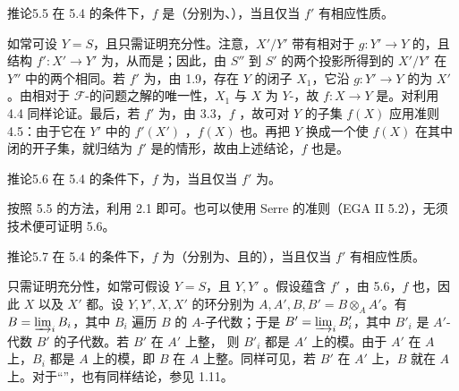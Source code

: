 \begin{SGAresult}{推论}{5.5}
在 5.4 的条件下，$f$ 是（分别为、），当且仅当 $f'$ 有相应性质。
\end{SGAresult}
如常可设 $Y=S$，且只需证明充分性。注意，$X'/Y'$ 带有相对于 $g:Y'\to Y$ 的，且结构 $f':X'\to Y'$ 为，从而是；因此，由 $S''$ 到 $S'$ 的两个投影所得到的 $X'/Y'$ 在 $Y''$ 中的两个相同。若 $f'$ 为，由 1.9，存在 $Y$ 的闭子 $X_1$，它沿 $g:Y'\to Y$ 的为 $X'$。由相对于 $\mathcal F$-的问题之解的唯一性，$X_1$ 与 $X$ 为 $Y$-，故 $f:X\to Y$ 是。对利用 4.4 同样论证。最后，若 $f'$ 为，由 3.3，$f$ ，故可对 $Y$ 的子集 $f(X)$ 应用准则 4.5：由于它在 $Y'$ 中的 $f'(X')$ ，$f(X)$ 也。再把 $Y$ 换成一个使 $f(X)$ 在其中闭的开子集，就归结为 $f'$ 是的情形，故由上述结论，$f$ 也是。

\begin{SGAresult}{推论}{5.6}
在 5.4 的条件下，$f$ 为，当且仅当 $f'$ 为。
\end{SGAresult}
按照 5.5 的方法，利用 2.1 即可。也可以使用 Serre 的准则（EGA II 5.2），无须技术便可证明 5.6。

\begin{SGAresult}{推论}{5.7}
在 5.4 的条件下，$f$ 为（分别为、且的），当且仅当 $f'$ 有相应性质。
\end{SGAresult}
只需证明充分性，如常可假设 $Y=S$，且 $Y,Y'$ 。假设蕴含 $f'$ ，由 5.6，$f$ 也，因此 $X$ 以及 $X'$ 都。设 $Y,Y',X,X'$ 的环分别为 $A,A',B,B'=B\otimes_A A'$。有 $B=\varinjlim_i B_i$，其中 $B_i$ 遍历 $B$ 的 $A$-子代数；于是 $B'=\varinjlim_i B'_i$，其中 $B'_i$ 是 $A'$-代数 $B'$ 的子代数。若 $B'$ 在 $A'$ 上整，
则 $B'_i$ 都是 $A'$ 上的模。由于 $A'$ 在 $A$ 上，$B_i$ 都是 $A$ 上的模，即 $B$ 在 $A$ 上整。同样可见，若 $B'$ 在 $A'$ 上，$B$ 就在 $A$ 上。对于“”，也有同样结论，参见 1.11。

